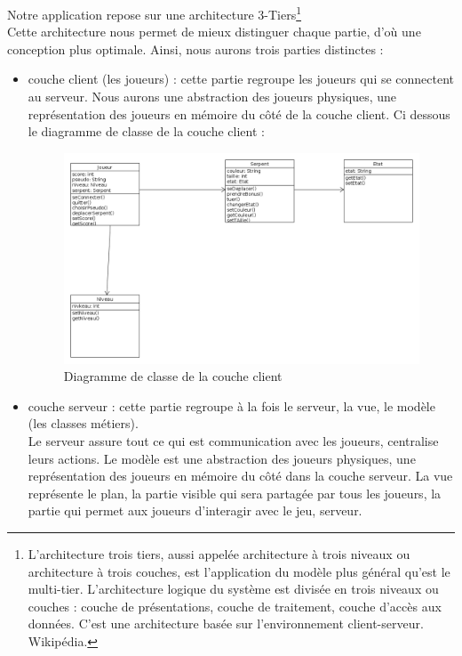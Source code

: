 \par
Notre application repose sur une architecture 3-Tiers\footnote{L'architecture trois tiers, aussi appelée architecture à trois niveaux ou architecture à trois couches, est l'application du modèle plus général qu'est le multi-tier. L'architecture logique du système est divisée en trois niveaux ou couches : couche de présentations, couche de traitement, couche d'accès aux données. C'est une architecture basée sur l'environnement client-serveur. Wikipédia.}\\

Cette architecture nous permet de mieux distinguer chaque partie, d'où une conception plus optimale. Ainsi, nous aurons trois parties distinctes : 

\begin{itemize}

	\item couche client (les joueurs) : cette partie regroupe les joueurs qui se connectent au serveur. Nous aurons une abstraction des joueurs physiques, une représentation des joueurs en mémoire du côté de la couche client. Ci dessous le diagramme de classe de la couche client :

\begin{figure}[!h]
	\centering
	\includegraphics[scale = 0.40]{img/diagClient.png}
	\caption{Diagramme de classe de la couche client}
\end{figure}

	
	\item couche serveur : cette partie regroupe à la fois le serveur, la vue, le modèle (les classes métiers). \\
	Le serveur assure tout ce qui est communication avec les joueurs, centralise leurs actions. Le modèle est une abstraction des joueurs physiques, une représentation des joueurs en mémoire du côté dans la couche serveur. La vue représente le plan, la partie visible qui sera partagée par tous les joueurs, la partie qui permet aux joueurs d'interagir avec le jeu, serveur. \\
	

\end{itemize}
